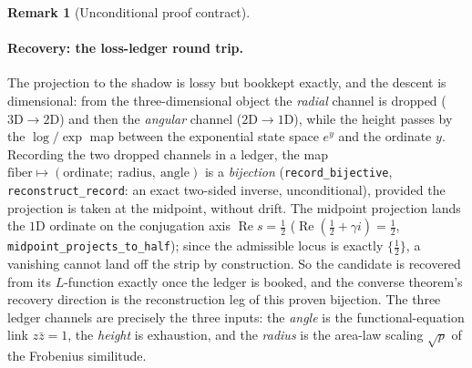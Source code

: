 \documentclass[11pt]{article}
\theoremstyle{definition}
\newtheorem{remark}[theorem]{Remark}
\renewcommand{\Re}{\operatorname{Re}}
\begin{document}
\begin{remark}[Unconditional proof contract]
\begin{enumerate}
\paragraph{Recovery: the loss-ledger round trip.} The projection to the shadow is lossy but bookkept
exactly, and the descent is dimensional: from the three-dimensional object the \emph{radial} channel is
dropped ($3\mathrm D\!\to\!2\mathrm D$) and then the \emph{angular} channel ($2\mathrm D\!\to\!1\mathrm D$),
while the height passes by the $\log/\exp$ map between the exponential state space $e^{y}$ and the
ordinate $y$. Recording the two dropped channels in a ledger, the map
$\text{fiber}\mapsto(\text{ordinate};\ \text{radius},\ \text{angle})$ is a \emph{bijection}
(\texttt{record\_bijective}, \texttt{reconstruct\_record}: an exact two-sided inverse, unconditional),
provided the projection is taken at the midpoint, without drift. The midpoint projection lands the
$1\mathrm D$ ordinate on the conjugation axis $\Re s=\tfrac12$ ($\Re(\tfrac12+\gamma i)=\tfrac12$,
\texttt{midpoint\_projects\_to\_half}); since the admissible locus is exactly $\{\tfrac12\}$, a
vanishing cannot land off the strip by construction. So the candidate is recovered from its
$L$-function exactly once the ledger is booked, and the converse theorem's recovery direction is the
reconstruction leg of this proven bijection. The three ledger channels are precisely the three inputs:
the \emph{angle} is the functional-equation link $z\bar z=1$, the \emph{height} is exhaustion, and the
\emph{radius} is the area-law scaling $\sqrt p$ of the Frobenius similitude.


\end{enumerate}
\end{remark}
\end{document}
